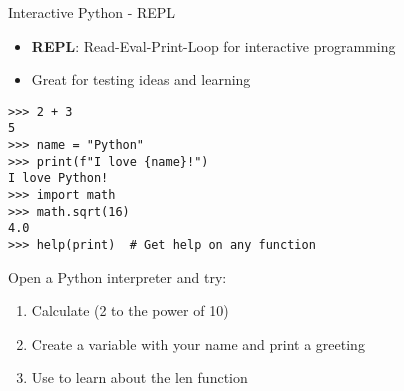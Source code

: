 \begin{frame}[fragile]{Interactive Python - REPL}
    \begin{itemize}
        \item \textbf{REPL}: Read-Eval-Print-Loop for interactive programming
        \item Great for testing ideas and learning
    \end{itemize}
    
    \begin{codeblock}
        \begin{lstlisting}
>>> 2 + 3
5
>>> name = "Python"
>>> print(f"I love {name}!")
I love Python!
>>> import math
>>> math.sqrt(16)
4.0
>>> help(print)  # Get help on any function
        \end{lstlisting}
    \end{codeblock}
    
    \begin{exercise}
        Open a Python interpreter and try:
        \begin{enumerate}
            \item Calculate  (2 to the power of 10)
            \item Create a variable with your name and print a greeting
            \item Use  to learn about the len function
        \end{enumerate}
    \end{exercise}
\end{frame}
